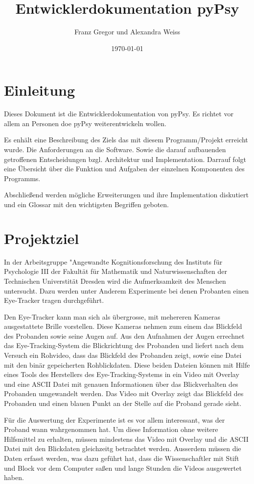 \documentclass[a4paper,draft]{scrartcl}
\title{Entwicklerdokumentation pyPsy}
\author{Franz Gregor und Alexandra Weiss}
\date{\today}
\begin{document}
\maketitle
\newpage
\tableofcontents
\newpage
\section{Einleitung}
Dieses Dokument ist die Entwicklerdokumentation von pyPsy.
Es richtet vor allem an Personen doe pyPsy weiterentwickeln wollen.

Es enh\"alt eine Beschreibung des Ziels das mit diesem Programm/Projekt erreicht wurde.
Die Anforderungen an die Software.
Sowie die darauf aufbauenden getroffenen Entscheidungen bzgl. Architektur und Implementation.
Darrauf folgt eine \"Ubersicht \"uber die Funktion und Aufgaben der einzelnen Komponenten des Programms.

Abschlie\ss end werden m\"ogliche Erweiterungen und ihre Implementation diskutiert und ein Glossar mit den wichtigsten Begriffen geboten.

\section{Projektziel}
In der Arbeitsgruppe "Angewandte Kognitionsforschung des Instituts f\"ur Psychologie III der Fakult\"at f\"ur Mathematik und Naturwissenschaften der Technischen Universtit\"at Dresden wird die Aufmerksamkeit des Menschen untersucht.
Dazu werden unter Anderem Experimente bei denen Probanten einen Eye-Tracker tragen durchgef\"uhrt.

Den Eye-Tracker kann man sich als \"ubergrosse, mit mehereren Kameras ausgestattete Brille vorstellen.
Diese Kameras nehmen zum einem das Blickfeld des Probanden sowie seine Augen auf.
Aus den Aufnahmen der Augen errechnet das Eye-Tracking-System die Blickrichtung des Probanden und liefert nach dem Versuch ein Rohvideo, dass das Blickfeld des Probanden zeigt, sowie eine Datei mit den bin\"ar gepeicherten Rohblickdaten.
Diese beiden Dateien k\"onnen mit Hilfe eines Tools des Herstellers des Eye-Tracking-Systems in ein Video mit Overlay und eine ASCII Datei mit genauen Informationen \"uber das Blickverhalten des Probanden umgewandelt werden.
Das Video mit Overlay zeigt das Blickfeld des Probanden und einen blauen Punkt an der Stelle auf die Proband gerade sieht.

F\"ur die Auswertung der Experimente ist es vor allem interessant, was der Proband wann wahrgenommen hat.
Um diese Information ohne weitere Hilfsmittel zu erhalten, m\"ussen mindestens das Video mit Overlay und die ASCII Datei mit den Blickdaten gleichzeitg betrachtet werden.
Ausserdem m\"ussen die Daten erfasst werden, was dazu gef\"uhrt hat, dass die Wissenschaftler mit Stift und Block vor dem Computer sa\ss en und lange Stunden die Videos ausgewertet haben.
\end{document}
